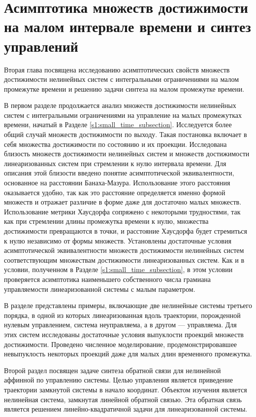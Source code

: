\documentclass[../main.tex]{subfiles}
\begin{document}
\clearpage
\section{Асимптотика множеств достижимости на малом интервале времени и синтез управлений}

Вторая глава посвящена исследованию асимптотических свойств множеств достижимости нелинейных систем с интегральными ограничениями на малом промежутке времени и решению задачи синтеза на малом промежутке времени. 

В первом разделе продолжается анализ множеств достижимости нелинейных систем с интегральными ограничениями на управление на малых промежутках времени, начатый в Разделе \ref{s1:small_time_subsection}. 
Исследуется более общий случай множеств достижимости по выходу.
Такая постановка включает в себя множества достижимости по состоянию и их проекции.
Исследована близость множеств достижимости нелинейных систем и множеств достижимости линеаризованных систем при стремлении к нулю интервала времени. 
Для описания этой близости введено понятие асимптотической эквивалентности, основанное на расстоянии Банаха-Мазура. 
Использование этого расстояния оказывается удобно, так как это расстояние определяется именно формой множеств и отражает различие в форме даже для достаточно малых множеств. 
Использование метрики Хаусдорфа сопряжено с некоторыми трудностями, так как при стремлении длины промежутка времени к нулю, множества достижимости превращаются в точки, и расстояние Хаусдорфа будет стремиться к нулю независимо от формы множеств.
Установлены достаточные условия асимптотической эквивалентности множеств достижимости нелинейных систем соответствующим множествам достижимости линеаризованных систем.
Как и в условии, полученном в Разделе \ref{s1:small_time_subsection}, в этом условии проверяется асимптотика наименьшего собственного числа грамиана управляемости линеаризованной системы с малым параметром.

В разделе представлены примеры, включающие две нелинейные системы третьего порядка, в одной из которых линеаризованная вдоль траектории, порожденной нулевым управлением, система неуправляема, а в другом --- управляема.
Для этих систем исследованы достаточные условия выпуклости проекций множеств достижимости. 
Проведено численное моделирование, продемонстрировавшее невыпуклость некоторых проекций даже для малых длин временного промежутка.

Второй раздел посвящен задаче синтеза обратной связи для нелинейной аффинной по управлению системы. 
Целью управления является приведение траектории замкнутой системы в начало координат. 
Объектом изучения является нелинейная система, замкнутая линейной обратной связью. 
Эта обратная связь является решением линейно-квадратичной задачи для линеаризованной системы. 
\end{document}
